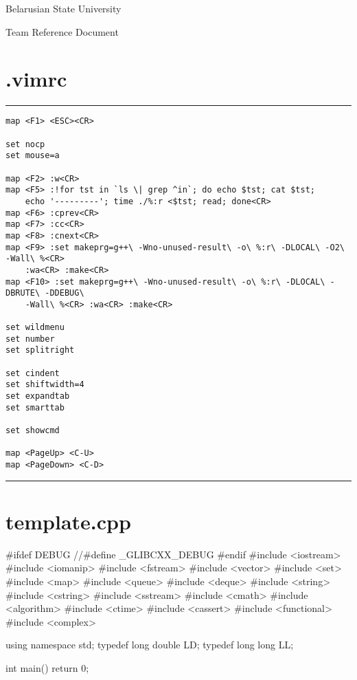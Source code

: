 \documentclass[12pt, titlepage]{article}
\begin{document}
 
\begin{titlepage}
\rule{0pt}{0pt}
\vfill

\centerline{\Huge \textrm{Belarusian State University}}
\vskip 5mm
\centerline{\Large \textsf{Team Reference Document}}

\vfill
\rule{0pt}{0pt}
\end{titlepage}

\section*{.vimrc}

{\color{linescolor}\hrule\vskip2mm}
{\footnotesize\begin{verbatim}
map <F1> <ESC><CR>

set nocp
set mouse=a

map <F2> :w<CR>
map <F5> :!for tst in `ls \| grep ^in`; do echo $tst; cat $tst;
    echo '---------'; time ./%:r <$tst; read; done<CR> 
map <F6> :cprev<CR>
map <F7> :cc<CR>
map <F8> :cnext<CR>
map <F9> :set makeprg=g++\ -Wno-unused-result\ -o\ %:r\ -DLOCAL\ -O2\ -Wall\ %<CR>
    :wa<CR> :make<CR>
map <F10> :set makeprg=g++\ -Wno-unused-result\ -o\ %:r\ -DLOCAL\ -DBRUTE\ -DDEBUG\
    -Wall\ %<CR> :wa<CR> :make<CR>

set wildmenu
set number
set splitright

set cindent
set shiftwidth=4
set expandtab
set smarttab

set showcmd

map <PageUp> <C-U>
map <PageDown> <C-D> 
\end{verbatim}
}{\vskip2mm\color{linescolor}\hrule}

\newpage\section*{template.cpp}
\begin{cppcode}
#ifdef DEBUG
//#define _GLIBCXX_DEBUG
#endif
#include <iostream>
#include <iomanip>
#include <fstream>
#include <vector>
#include <set>
#include <map>
#include <queue>
#include <deque>
#include <string>
#include <cstring>
#include <sstream>
#include <cmath>
#include <algorithm>
#include <ctime>
#include <cassert>
#include <functional>
#include <complex>

using namespace std;
typedef long double LD;
typedef long long LL;

int main()
{
    return 0;
}
\end{cppcode}

\newpage\tableofcontents
\end{document}
